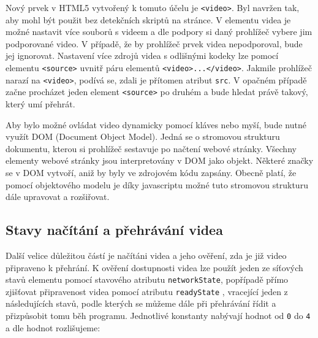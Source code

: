 Nový prvek v HTML5 vytvořený k tomuto účelu je \texttt{<video>}. Byl navržen tak, aby mohl být použit bez detekčních skriptů na stránce. V elementu videa je možné nastavit více souborů s videem a dle podpory si daný prohlížeč vybere jim podporované video. V případě, že by prohlížeč prvek videa nepodporoval, bude jej ignorovat. Nastavení více zdrojů videa s odlišnými kodeky lze pomocí elementu \texttt{<source>} uvnitř páru elementů \texttt{<video>...</video>}. Jakmile prohlížeč narazí na \texttt{<video>}, podívá se, zdali je přítomen atribut \texttt{src}. V opačném případě začne procházet jeden element \texttt{<source>} po druhém a bude hledat právě takový, který umí přehrát.

Aby bylo možné ovládat video dynamicky pomocí kláves nebo myší, bude nutné využít DOM (Document Object Model). Jedná se o stromovou strukturu dokumentu, kterou si prohlížeč sestavuje po načtení webové stránky. Všechny elementy webové stránky jsou interpretovány v DOM jako objekt. Některé značky se v DOM vytvoří, aniž by byly ve zdrojovém kódu zapsány. Obecně platí, že pomocí objektového modelu je díky javascriptu možné tuto stromovou strukturu dále upravovat a rozšiřovat. 



\subsection{Stavy načítání a přehrávání videa}
Další velice důležitou částí je načítáni videa a jeho ověření, zda je již video připraveno k přehrání. K ověření dostupnosti videa lze použít jeden ze síťových stavů elementu pomocí stavového atributu \texttt{networkState}, popřípadě přímo zjišťovat připravenost videa pomocí atributu \texttt{readyState} \cite{html5}, vracející jeden z následujících stavů, podle kterých se můžeme dále při přehrávání řídit a přizpůsobit tomu běh programu. Jednotlivé konstanty nabývají hodnot od \texttt{0} do \texttt{4} a dle hodnot rozlišujeme:


